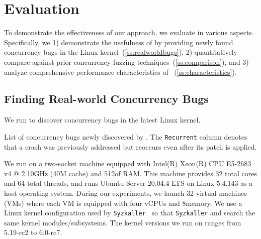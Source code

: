 \section{Evaluation}
\label{s:eval}

To demonstrate the effectiveness of our approach, 
we evaluate \sys in various aspects.
%
Specifically, we 1) demonstrate the usefulness of \sys by providing
newly found concurrency bugs in the Linux
kernel~(\autoref{ss:realworldbugs}),
%
2) quantitatively compare \sys against prior concurrency fuzzing
techniques~(\autoref{ss:comparison}), and
%
3) analyze comprehensive performance characteristics of
\sys~(\autoref{ss:characteristics}).
%

\subsection{Finding Real-world Concurrency Bugs}
\label{ss:realworldbugs}

We run \sys to discover concurrency bugs in the latest Linux kernel.

\begin{table}[t]
  \centering
  
  \caption{List of concurrency bugs newly discovered by \sys. The
    \texttt{Recurrent} column denotes that a crash was previously
    addressed but reoccurs even after its patch is applied.}
  \label{table:newbugs}
  \vspace{-8pt}
\end{table}

%
We run \sys on a two-socket machine equipped with
Intel(R) Xeon(R) CPU E5-2683 v4 @ 2.10GHz (40M cache) and 512\GB of
RAM.
%
This machine provides 32 total cores and 64 total threads, and runs
Ubuntu Server 20.04.4 LTS on Linux 5.4.143 as a host operating system.
%
During our experiments, we launch 32 virtual machines (VMs) where each
VM is equipped with four vCPUs and 8\GB memory.
%
We use a Linux kernel configuration used by
\texttt{Syzkaller}~\cite{syzkaller} so that \texttt{Syzkaller} and
\sys search the same kernel modules/subsystems.
The kernel versions we run on \sys ranges from 5.19-rc2 to 6.0-rc7.
%


